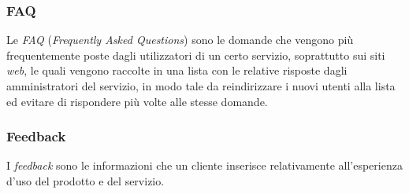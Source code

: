 
\subsubsection*{FAQ}
Le \textit{FAQ} (\textit{Frequently Asked Questions}) sono le domande che vengono più frequentemente poste dagli utilizzatori di un certo servizio, soprattutto sui siti \textit{web},
le quali vengono raccolte in una lista con le relative risposte dagli amministratori del servizio, in modo tale da reindirizzare i nuovi utenti alla lista ed evitare di rispondere più volte alle stesse domande.

\subsubsection*{Feedback}
I \textit{feedback} sono le informazioni che un cliente inserisce relativamente
all'esperienza d'uso del prodotto e del servizio.

\newpage
